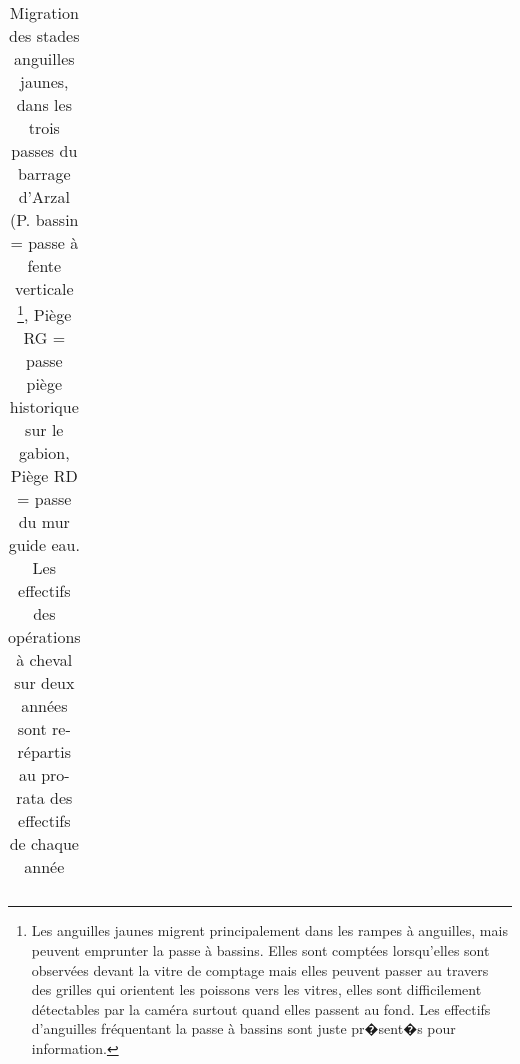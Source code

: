\begin{table}[ht]
\begin{tabular}{lrrrr}
\end{tabular}
\caption{Migration des stades anguilles jaunes, dans les
		trois passes du barrage d'Arzal (P. bassin = passe à fente verticale
		\footnote{Les anguilles jaunes migrent principalement dans les rampes à
		anguilles, mais peuvent emprunter la passe à bassins. Elles sont comptées lorsqu'elles sont observées devant la vitre de comptage mais elles peuvent passer au travers des grilles qui
orientent les poissons vers les vitres, elles sont difficilement détectables par
la caméra surtout quand elles passent au fond. Les effectifs d'anguilles
fréquentant la passe à bassins sont juste pr�sent�s pour information.}, Piège RG = passe piège historique
		sur le gabion, Piège RD = passe du mur guide eau. Les effectifs des opérations à cheval sur deux années sont re-
		répartis au pro-rata des effectifs de chaque année } 
\label{table_bilanannuel_ang}
\end{table}
